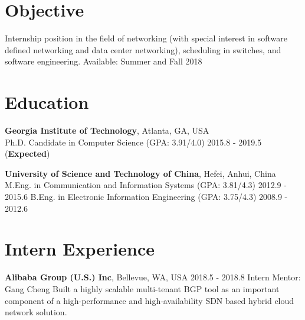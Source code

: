 \documentclass[line,11pt,letter]{F:/Dropbox (Personal)/personal-stuffs/CV/LaTeX/includes/cls/myRes}
\begin{document}

\address{266 Ferst Dr, Atlanta, GA 30332, United States}
\address{Cell: +1(404)697-0608. \hspace{5pt} Email: gonglong@gatech.edu}
\begin{resume}



\vspace*{-10pt}
\vspace*{-15pt}
\section{Objective}
\vspace{-4pt}
{\setlength{\parskip}{0pt}
 {Internship position in the field of networking (with special interest in software defined networking and data center networking), scheduling in switches, and software engineering. \hfill{Available: Summer and Fall 2018}\break}
}%
\negspace
\section{Education}
\vspace{-4pt}
{\setlength{\parskip}{0pt}
\textbf{Georgia Institute of Technology}, Atlanta, GA, USA\\
{\hspace*{1em} Ph.D. Candidate in Computer Science (GPA: 3.91/4.0) \hspace{52.5pt} \hfill 2015.8 - 2019.5 (\textbf{Expected})\break}
}
\sspace

{\setlength{\parskip}{0pt}
\textbf{University of Science and Technology of China}, Hefei, Anhui, China\\
{\hspace*{1em} M.Eng. in Communication and Information Systems (GPA: 3.81/4.3) \hspace{52.5pt} \hfill 2012.9 - 2015.6\break}
{\hspace*{1em} B.Eng. in Electronic Information Engineering (GPA: 3.75/4.3) \hspace{52.5pt} \hfill 2008.9 - 2012.6\break}
}
\negspace
\section{Intern Experience}
\vspace{-4pt}
{\setlength{\parskip}{0pt}
{\bf Alibaba Group (U.S.) Inc}, Bellevue, WA, USA \hfill 2018.5 - 2018.8\break
{\hspace*{1em} Intern \hfill Mentor: Gang Cheng\break}
{\hspace*{1em} Built a highly scalable multi-tenant BGP tool as an important component of a high-performance and high-availability SDN based hybrid cloud network solution. \break}
}\sspace


\end{resume}
\end{document}
